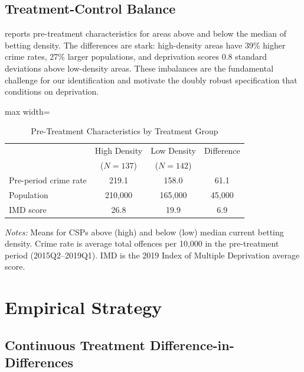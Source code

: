 \documentclass[12pt]{article}
\begin{document}
\subsection{Treatment-Control Balance}

 reports pre-treatment characteristics for areas above and below the median of betting density. The differences are stark: high-density areas have 39\% higher crime rates, 27\% larger populations, and deprivation scores 0.8 standard deviations above low-density areas. These imbalances are the fundamental challenge for our identification and motivate the doubly robust specification that conditions on deprivation.

\begin{table}[H]
\centering
\caption{Pre-Treatment Characteristics by Treatment Group}
\label{tab:balance}
\begin{adjustbox}{max width=\textwidth}
\begin{threeparttable}
\begin{tabular}{lccc}
\toprule
& High Density & Low Density & Difference \\
& ($N = 137$) & ($N = 142$) & \\
\midrule
Pre-period crime rate & 219.1 & 158.0 & 61.1 \\
Population & 210,000 & 165,000 & 45,000 \\
IMD score & 26.8 & 19.9 & 6.9 \\
\bottomrule
\end{tabular}
\begin{tablenotes}[flushleft]
\small
\item \textit{Notes:} Means for CSPs above (high) and below (low) median current betting density. Crime rate is average total offences per 10,000 in the pre-treatment period (2015Q2--2019Q1). IMD is the 2019 Index of Multiple Deprivation average score.
\end{tablenotes}
\end{threeparttable}
\end{adjustbox}
\end{table}

\section{Empirical Strategy}
\label{sec:strategy}

\subsection{Continuous Treatment Difference-in-Differences}
\end{document}
